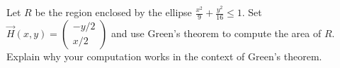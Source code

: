 \documentclass{ximera}
\author{Bart Snapp}
\begin{document}
\begin{exercise}
  Let $R$ be the region enclosed by the ellipse $\frac{x^2}{9} +
  \frac{y^2}{16} \le 1$. Set $\vec{H}(x,y)
  = \begin{pmatrix}-y/2\\ x/2\end{pmatrix}$ and use Green's theorem to
    compute the area of $R$. Explain why your computation works in the
    context of Green's theorem.
\end{exercise}
\end{document}
